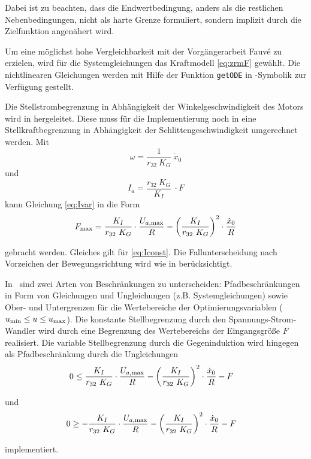 Dabei ist zu beachten, dass die Endwertbedingung, anders als die restlichen Nebenbedingungen, nicht als harte Grenze formuliert, sondern implizit durch die Zielfunktion angenähert wird. 

Um eine möglichst hohe Vergleichbarkeit mit der Vorgängerarbeit Fauvé \cite{fauve} zu erzielen, wird für die Systemgleichungen das Kraftmodell  \eqref{eq:zrmF} gewählt. Die nichtlinearen Gleichungen werden mit Hilfe der Funktion \texttt{getODE} in \casadi-Symbolik zur Verfügung gestellt.

Die Stellstrombegrenzung in Abhängigkeit der Winkelgeschwindigkeit des Motors wird in  hergeleitet. Diese muss für die Implementierung noch in eine Stellkraftbegrenzung in Abhängigkeit der Schlittengeschwindigkeit umgerechnet werden.
Mit 
	\[
	\omega = \frac{1}{r_{32}\ K_G} \ \dot{x}_0 
\]
und 
	\[
	I_a = \frac{r_{32}\ K_G}{K_I} \ \cdot F
\]
kann Gleichung \eqref{eq:Ivar} in die Form
	\[
	F_{\mathrm{max}} = \frac{K_I}{r_{32}\ K_G} \cdot \frac{U_{a\mathrm{,max}}}{R} - \left(\frac{K_I}{r_{32}\ K_G}\right)^2 \cdot \frac{\dot{x}_0}{R}
\]

gebracht werden. Gleiches gilt für \eqref{eq:Iconst}. Die Fallunterscheidung nach Vorzeichen der Bewegungsrichtung wird wie in  berücksichtigt. 

In \casadi\ sind zwei Arten von Beschränkungen zu unterscheiden: Pfadbeschränkungen in Form von Gleichungen und Ungleichungen (z.B. Systemgleichungen) sowie Ober- und Untergrenzen für die Wertebereiche der Optimierungsvariablen (\zB $u_{\mathrm{min}} \leq u \leq u_{\mathrm{max}}$). Die konstante Stellbegrenzung durch den Spannungs-Strom-Wandler wird durch eine Begrenzung des Wertebereichs der Eingangsgröße $F$ realisiert. Die variable Stellbegrenzung durch die Gegeninduktion wird hingegen als Pfadbeschränkung durch die Ungleichungen
\[
	 0 \leq \frac{K_I}{r_{32}\ K_G} \cdot \frac{U_{a\mathrm{,max}}}{R} - \left(\frac{K_I}{r_{32}\ K_G}\right)^2 \cdot \frac{\dot{x}_0}{R} - F \quad 
\]

und
\[
	 0 \geq -\frac{K_I}{r_{32}\ K_G} \cdot \frac{U_{a\mathrm{,max}}}{R} - \left(\frac{K_I}{r_{32}\ K_G}\right)^2 \cdot \frac{\dot{x}_0}{R} - F \quad 
\]

implementiert.

